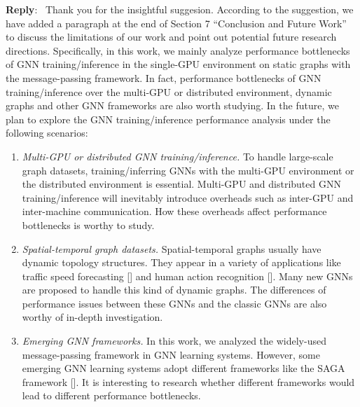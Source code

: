 \documentclass[12pt]{article}
\newcounter{reviewer}
\newcounter{point}[reviewer]
\newenvironment{reply}
   {\medskip \noindent \textbf{Reply}:\  }
   {\medskip}
\begin{document}
\begin{reply}
    Thank you for the insightful suggesion.
    According to the suggestion, we have added a paragraph at the end of Section 7 ``Conclusion and Future Work'' to discuss the limitations of our work and point out potential future research directions.
    Specifically, in this work, we mainly analyze performance bottlenecks of GNN training/inference in the single-GPU environment on static graphs with the message-passing framework.
    In fact, performance bottlenecks of GNN training/inference over the multi-GPU or distributed environment, dynamic graphs and other GNN frameworks are also worth studying.
    In the future, we plan to explore the GNN training/inference performance analysis under the following scenarios:
\begin{enumerate}
    \item \emph{Multi-GPU or distributed GNN training/inference.}
    To handle large-scale graph datasets, training/inferring GNNs with the multi-GPU environment or the distributed environment is essential.
    Multi-GPU and distributed GNN training/inference will inevitably introduce overheads such as inter-GPU and inter-machine communication. 
    How these overheads affect performance bottlenecks is worthy to study.

    \item \emph{Spatial-temporal graph datasets.}
    Spatial-temporal graphs usually have dynamic topology structures.
    They appear in a variety of applications like traffic speed forecasting [\cite{li2018_DCRNN}] and human action recognition [\cite{yan2018_STGCN}].
    Many new GNNs are proposed to handle this kind of dynamic graphs.
    The differences of performance issues between these GNNs and the classic GNNs are also worthy of in-depth investigation. 

    \item \emph{Emerging GNN frameworks.}
    In this work, we analyzed the widely-used message-passing framework in GNN learning systems.
    However, some emerging GNN learning systems adopt different frameworks like the SAGA framework [\cite{ma2019_neugraph}].
    It is interesting to research whether different frameworks would lead to different performance bottlenecks.
\end{enumerate}

\end{reply}



\end{document}
